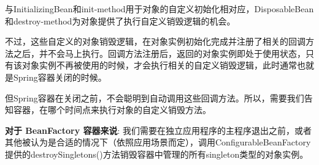 与InitializingBean和init-method用于对象的自定义初始化相对应，DisposableBean和destroy-method为对象提供了执行自定义销毁逻辑的机会。

不过，这些自定义的对象销毁逻辑，在对象实例初始化完成并注册了相关的回调方法之后，并不会马上执行。回调方法注册后，返回的对象实例即处于使用状态，只有该对象实例不再被使用的时候，才会执行相关的自定义销毁逻辑，此时通常也就是Spring容器关闭的时候。

但Spring容器在关闭之前，不会聪明到自动调用这些回调方法。所以，需要我们告知容器，在哪个时间点来执行对象的自定义销毁方法。

\textbf{对于 BeanFactory 容器来说}: 我们需要在独立应用程序的主程序退出之前，或者其他被认为是合适的情况下（依照应用场景而定），调用ConfigurableBeanFactory提供的destroySingletons()方法销毁容器中管理的所有singleton类型的对象实例。

\newpage